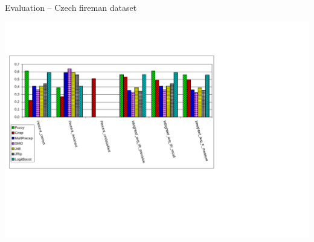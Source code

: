 \documentclass[xcolor=dvipsnames]{beamer}
\begin{document}
\begin{frame}{Evaluation -- Czech fireman dataset}
\centerline{\includegraphics[height=1.0\hsize, angle=-90]{img/fuzzy_2x10cross}}
\end{frame}
\end{document}
